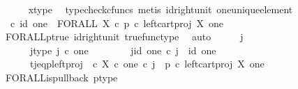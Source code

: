 \begin{isabellebody}
\ \ \ \ \isamarkupfalse%
\ x{\isacharunderscore}{\kern0pt}type\ \isamarkupfalse%
\ {\isacharparenleft}{\kern0pt}typecheck{\isacharunderscore}{\kern0pt}cfuncs{\isacharcomma}{\kern0pt}\ metis\ id{\isacharunderscore}{\kern0pt}right{\isacharunderscore}{\kern0pt}unit{}\ one{\isacharunderscore}{\kern0pt}unique{\isacharunderscore}{\kern0pt}element{\isacharparenright}{\kern0pt}\isanewline
\isanewline
\ \ \isamarkupfalse%
\ {\isachardoublequoteopen}{\isasymt}\ {\isasymcirc}\isactrlsub c\ id\ one\ {\isacharequal}{\kern0pt}\ FORALL\ X\ {\isasymcirc}\isactrlsub c\ {\isacharparenleft}{\kern0pt}p\ {\isasymcirc}\isactrlsub c\ left{\isacharunderscore}{\kern0pt}cart{\isacharunderscore}{\kern0pt}proj\ X\ one{\isacharparenright}{\kern0pt}\isactrlsup {\isasymsharp}{\isachardoublequoteclose}\isanewline
\ \ \ \ \isamarkupfalse%
\ FORALL{\isacharunderscore}{\kern0pt}p{\isacharunderscore}{\kern0pt}true\ id{\isacharunderscore}{\kern0pt}right{\isacharunderscore}{\kern0pt}unit{}\ true{\isacharunderscore}{\kern0pt}func{\isacharunderscore}{\kern0pt}type\ \isamarkupfalse%
\ auto\isanewline
\ \ \isamarkupfalse%
\ \isamarkupfalse%
\ j\ \ \isanewline
\ \ \ \ \ \ j{\isacharunderscore}{\kern0pt}type{\isacharcolon}{\kern0pt}\ {\isachardoublequoteopen}j\ {\isasymin}\isactrlsub c\ one{\isachardoublequoteclose}\ \ \isanewline
\ \ \ \ \ \ j{\isacharunderscore}{\kern0pt}id{\isacharcolon}{\kern0pt}\ {\isachardoublequoteopen}{\isasymbeta}\isactrlbsub one\isactrlesub \ {\isasymcirc}\isactrlsub c\ j\ {\isacharequal}{\kern0pt}\ id\ one{\isachardoublequoteclose}\ \isanewline
\ \ \ \ \ \ t{\isacharunderscore}{\kern0pt}j{\isacharunderscore}{\kern0pt}eq{\isacharunderscore}{\kern0pt}p{\isacharunderscore}{\kern0pt}left{\isacharunderscore}{\kern0pt}proj{\isacharcolon}{\kern0pt}\ {\isachardoublequoteopen}{\isacharparenleft}{\kern0pt}{\isasymt}\ {\isasymcirc}\isactrlsub c\ {\isasymbeta}\isactrlbsub X\ {\isasymtimes}\isactrlsub c\ one\isactrlesub {\isacharparenright}{\kern0pt}\isactrlsup {\isasymsharp}\ {\isasymcirc}\isactrlsub c\ j\ {\isacharequal}{\kern0pt}\ {\isacharparenleft}{\kern0pt}p\ {\isasymcirc}\isactrlsub c\ left{\isacharunderscore}{\kern0pt}cart{\isacharunderscore}{\kern0pt}proj\ X\ one{\isacharparenright}{\kern0pt}\isactrlsup {\isasymsharp}{\isachardoublequoteclose}\isanewline
\ \ \ \ \isamarkupfalse%
\ FORALL{\isacharunderscore}{\kern0pt}is{\isacharunderscore}{\kern0pt}pullback\ p{\isacharunderscore}{\kern0pt}type\ \isamarkupfalse%

\end{isabellebody}
